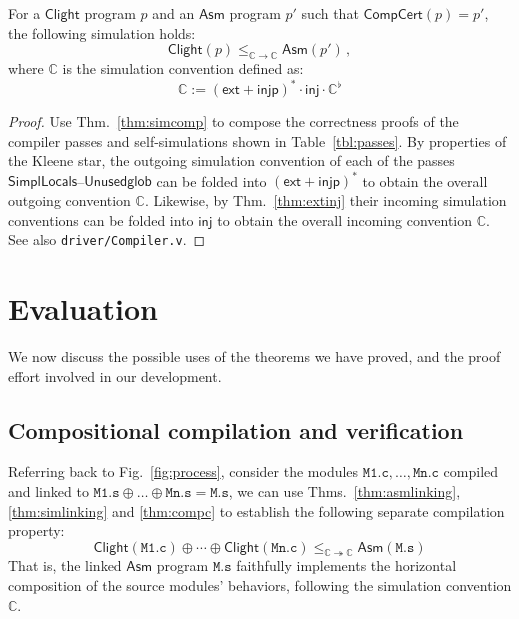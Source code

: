 \documentclass[sigplan,10pt,review,anonymous]{acmart}
\newcommand{\kw}[1]{\ensuremath{ \mathsf{#1} }}
\begin{document}
\begin{theorem} \label{thm:compc} %
For a \kw{Clight} program $p$
and an \kw{Asm} program $p'$ such that
$\kw{CompCert}(p) = p'$,
the following simulation holds:
\[
    \kw{Clight}(p) \le_{\mathbb{C} \rightarrow \mathbb{C}}
    \kw{Asm}(p') \,,
\]
where $\mathbb{C}$ is the simulation convention defined as:
\[
    \mathbb{C} := (\kw{ext} + \kw{injp})^* \cdot \kw{inj} \cdot
      \mathbb{C}^\flat
\]
\begin{proof}
Use Thm.~\ref{thm:simcomp} to compose
the correctness proofs of the compiler passes and
self-simulations shown in Table~\ref{tbl:passes}.
By properties of the Kleene star,
the outgoing simulation convention of each of the
passes \kw{SimplLocals}--\kw{Unusedglob}
can be folded into $(\kw{ext} + \kw{injp})^*$
to obtain the overall outgoing convention $\mathbb{C}$.
Likewise, by Thm.~\ref{thm:extinj}
their incoming simulation conventions
can be folded into $\kw{inj}$
to obtain the overall incoming convention $\mathbb{C}$.
See also \texttt{driver/Compiler.v}.
\end{proof}
\end{theorem}



\section{Evaluation} \label{sec:eval} %

We now discuss the possible uses of the theorems we have proved,
and the proof effort involved in our development.

\subsection{Compositional compilation and verification} \label{sec:cver} %

Referring back to Fig.~\ref{fig:process},
consider the modules
$\mathtt{M1.c}, \ldots, \mathtt{Mn.c}$
compiled and linked to
$\mathtt{M1.s} \oplus \ldots \oplus \mathtt{Mn.s} = \mathtt{M.s}$,
we can use
Thms.~\ref{thm:asmlinking},
\ref{thm:simlinking} and
\ref{thm:compc}
to establish the following separate compilation property:
\begin{equation}
  \label{eqn:sepcomp}
  \kw{Clight}(\mathtt{M1.c}) \oplus \cdots \oplus \kw{Clight}(\mathtt{Mn.c})
  \le_{\mathbb{C} \twoheadrightarrow \mathbb{C}}
  \kw{Asm}(\mathtt{M.s})
\end{equation}
That is,
the linked \kw{Asm} program
$\mathtt{M.s}$
faithfully implements
the horizontal composition of the source modules' behaviors,
following the simulation convention $\mathbb{C}$.
\end{document}
